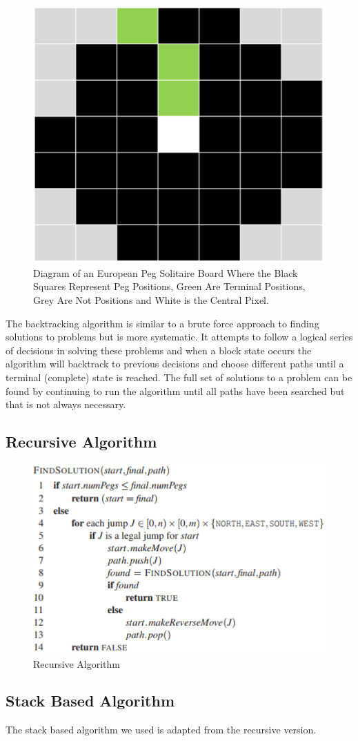 \documentclass[a4paper]{article}
\begin{document}
\begin{figure}[H]
	\centering
	\label{board}
	\includegraphics[width=.50\textwidth,scale=.50]{images/board}
	\caption{Diagram of an European Peg Solitaire Board Where the
				Black Squares Represent Peg Positions,
				Green Are Terminal Positions,
				Grey Are Not Positions and
				White is the Central Pixel.
			}
\end{figure}


\noindent The backtracking algorithm is similar to a brute force approach to finding solutions to problems but is more systematic. It attempts to follow a logical series of decisions in solving these problems and when a block state occurs the algorithm will backtrack to previous decisions and choose different paths until a terminal (complete) state is reached. The full set of solutions to a problem can be found by continuing to run the algorithm until all paths have been searched but that is not always necessary.

\subsection{Recursive Algorithm}
\begin{figure}[H]
	\centering
	\includegraphics[width=.50\textwidth,scale=.50]{images/recursive_algorithm}
	\caption{Recursive Algorithm \cite{lab5}}
\end{figure}

\subsection{Stack Based Algorithm}
The stack based algorithm we used is adapted from the recursive version.
\end{document}
